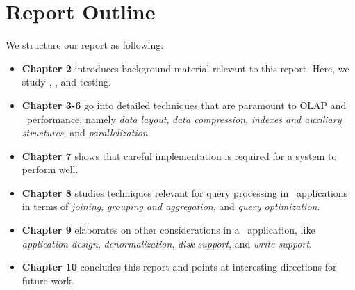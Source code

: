\section{Report Outline}
\label{sec:Thesis Outline}
We structure our report as following:
\begin{itemize}
  \item \textbf{Chapter 2} introduces background material relevant to this report. Here, we study \bi, \bd, and testing.
  \item \textbf{Chapter 3-6} go into detailed techniques that are paramount to OLAP and \bd~performance, namely \textit{data layout}, \textit{data compression}, \textit{indexes and auxiliary structures}, and \textit{parallelization}.
  \item \textbf{Chapter 7} shows that careful implementation is required for a system to perform well.
  \item \textbf{Chapter 8} studies techniques relevant for query processing in \bd~applications in terms of \textit{joining}, \textit{grouping and aggregation}, and \textit{query optimization}.
  \item \textbf{Chapter 9} elaborates on other considerations in a \bd~application, like \textit{application design}, \textit{denormalization}, \textit{disk support}, and \textit{write support}.
  \item \textbf{Chapter 10} concludes this report and points at interesting directions for future work.
\end{itemize}
